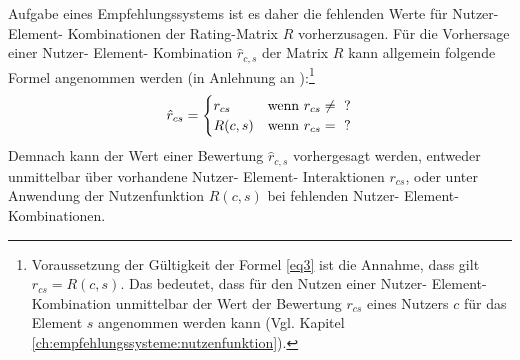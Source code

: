 Aufgabe eines Empfehlungssystems ist es daher die fehlenden Werte für Nutzer- Element- Kombinationen der Rating-Matrix $R$ vorherzusagen.
Für die Vorhersage einer Nutzer- Element- Kombination $\hat{r}_{c,s}$ der Matrix $R$ kann allgemein folgende Formel angenommen werden (in Anlehnung an \cite[S. 743]{adomavicius:inproceedings}):\footnote{Voraussetzung der Gültigkeit der Formel \ref{eq3} ist die Annahme, dass gilt $r_{cs} = R(c,s)$. Das bedeutet, dass für den Nutzen einer Nutzer- Element- Kombination unmittelbar der Wert der Bewertung $r_{cs}$ eines Nutzers $c$ für das Element $s$ angenommen werden kann (Vgl. Kapitel \ref{ch:empfehlungssysteme:nutzenfunktion}).}
\begin{equation}\label{eq3}
\hat{r}_{cs} =
    \begin{cases}
        r_{cs} & \textnormal{wenn } r_{cs} \neq \textnormal{ ?} \\
        R(c,s) & \textnormal{wenn }r_{cs} = \textnormal{ ?} \\
    \end{cases}
\end{equation}
Demnach kann der Wert einer Bewertung $\hat{r}_{c,s}$ vorhergesagt werden, entweder unmittelbar über vorhandene Nutzer- Element- Interaktionen $r_{cs}$, oder unter Anwendung der Nutzenfunktion $R(c,s)$ bei fehlenden Nutzer- Element- Kombinationen.

